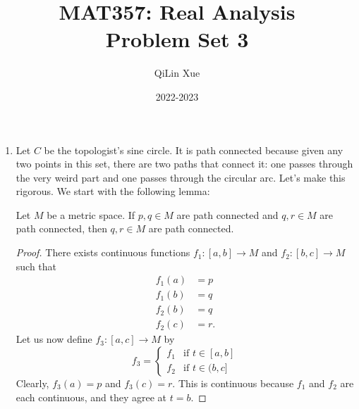 \documentclass{article}
\title{\vspace{-2cm}MAT357: Real Analysis \\ Problem Set 3}
\author{QiLin Xue}
\date{2022-2023}
\numberwithin{equation}{section}
\begin{document}
\maketitle
\begin{enumerate}
    \item Let $C$ be the topologist's sine circle. It is path connected because given any two points in this set, there are two paths that connect it: one passes through the very weird part and one passes through the circular arc. Let's make this rigorous. We start with the following lemma:
    \begin{lemma}
        Let $M$ be a metric space. If $p,q \in M$ are path connected and $q,r\in M$ are path connected, then $q,r\in M$ are path connected.
        \begin{proof}
            There exists continuous functions $f_1:[a,b] \to M$ and $f_2:[b,c] \to M$ such that 
            \begin{align}
                f_1(a) &= p \\
                f_1(b) &= q \\
                f_2(b) &= q \\
                f_2(c) &= r.
            \end{align} 
            Let us now define $f_3:[a,c] \to M$ by 
            \begin{equation}
                f_3 = \begin{cases}
                    f_1 & \text{if } t \in [a,b] \\
                    f_2 & \text{if } t \in (b,c]
                \end{cases}
            \end{equation}
            Clearly, $f_3(a)=p$ and $f_3(c)=r.$ This is continuous because $f_1$ and $f_2$ are each continuous, and they agree at $t=b.$
        \end{proof}
    \end{lemma}
    

\end{enumerate}
\end{document}
